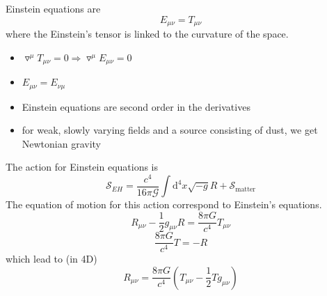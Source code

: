 \documentclass[a4paper]{book}
\theoremstyle{definition}
\theoremstyle{remark}
\begin{document}
Einstein equations are 
\begin{equation}
    E_{\mu\nu} = T_{\mu\nu}
\end{equation}
where the Einstein's tensor is linked to the curvature of the space. 
\begin{itemize}
    \item $\triangledown^\mu T_{\mu\nu} = 0 \Rightarrow \triangledown^\mu E_{\mu\nu} = 0$
    \item $E_{\mu\nu} = E_{\nu\mu}$
    \item Einstein equations are second order in the derivatives 
    \item for weak, slowly varying fields and a source consisting of dust, we get Newtonian gravity
\end{itemize}
The action for Einstein equations is 
\begin{equation}
    \mathcal{S}_{EH} = \frac{c^4}{16\pi \mathcal{G}}\int \text{d}^4 x \sqrt{-g}R + \mathcal{S}_{\text{matter}}
\end{equation}
The equation of motion for this action correspond to Einstein's equations. 
\begin{equation}
    R_{\mu\nu} - \frac{1}{2}g_{\mu\nu}R = \frac{8\pi G}{c^4}T_{\mu\nu}
\end{equation}
\begin{equation}
    \frac{8\pi G}{c^4}T = -R
\end{equation}
which lead to (in 4D)
\begin{equation}
    R_{\mu\nu} = \frac{8\pi G}{c^4}(T_{\mu\nu} - \frac{1}{2}Tg_{\mu\nu})
\end{equation}
\end{document}
